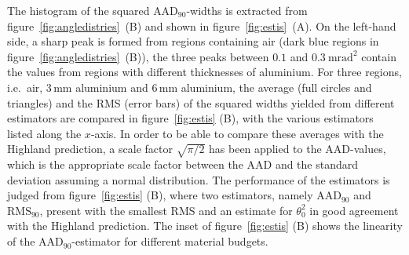 \documentclass{PoS}
\newcommand{\rmsninety}{\ensuremath{\textrm{RMS}_\textrm{90}}}
\newcommand{\aadninety}{\ensuremath{\textrm{AAD}_\textrm{90}}}
\begin{document}
%

The histogram of the squared $\aadninety$-widths is extracted from figure~\ref{fig:angledistries}~(B) and shown in figure~\ref{fig:estis}~(A).
On the left-hand side, a sharp peak is formed from regions containing air (dark blue regions in figure~\ref{fig:angledistries}~(B)),
 the three peaks between $0.1$ and $\SI{0.3}{\milli\radian}^2$ contain the values from regions with different thicknesses of aluminium.
For three regions, i.e.\ air, 3\,mm aluminium and 6\,mm aluminium, the average (full circles and triangles) and the RMS (error bars) of the squared widths yielded from different estimators are compared in figure~\ref{fig:estis} (B), 
 with the various estimators listed along the $x$-axis. 
In order to be able to compare these averages with the Highland prediction, a scale factor $\sqrt{\pi/2}$
 has been applied to the AAD-values, which is the appropriate scale factor between the AAD and the standard deviation assuming a normal distribution. 
The performance of the estimators is judged from figure~\ref{fig:estis} (B), where
two estimators, namely $\aadninety$ and $\rmsninety$, present with the smallest RMS and an estimate for $\theta_0^2$ in good agreement with the Highland prediction. 
The inset of figure~\ref{fig:estis} (B) shows the linearity of the $\aadninety$-estimator for different material budgets. 
\end{document}
